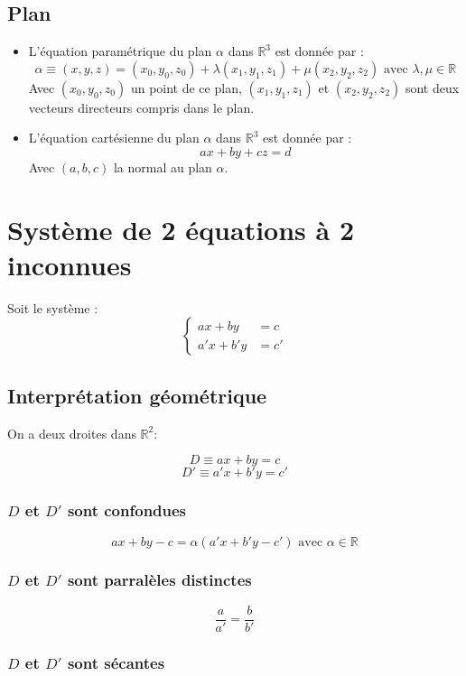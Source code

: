 \documentclass[a4paper,10pt]{report}
\begin{document}
\subsection{Plan}
\begin{itemize}
\item{L'équation paramétrique du plan $\alpha$ dans $\mathbb{R}^3$ est donnée par :
$$\alpha \equiv (x,y,z) = (x_0, y_0, z_0) + \lambda (x_1, y_1, z_1) + \mu (x_2, y_2, z_2) \mbox{ avec } \lambda,\mu \in \mathbb{R}$$
Avec $(x_0, y_0, z_0)$ un point de ce plan, $(x_1, y_1, z_1)$ et $(x_2, y_2, z_2)$ sont deux vecteurs directeurs compris dans le plan.}

\item{L'équation cartésienne du plan $\alpha$ dans $\mathbb{R}^3$ est donnée par :
$$ax + by + cz = d$$
Avec $(a,b,c)$ la normal au plan $\alpha$.
}
\end{itemize}

\section{Système de 2 équations à 2 inconnues}
Soit le système :
$$\left\{\begin{array}{ll}
 ax+by & = c\\
 a'x+b'y & = c'
 \end{array}\right.$$

\subsection{Interprétation géométrique}
On a deux droites dans $\mathbb{R}^2$:

$$D \equiv ax + by = c$$
$$D' \equiv a'x + b'y = c'$$

\subsubsection{$D$ et $D'$ sont confondues}

$$ax + by - c = \alpha (a'x + b'y - c') \mbox{ avec } \alpha \in \mathbb{R}$$

\subsubsection{$D$ et $D'$ sont parralèles distinctes}

$$\frac{a}{a'} = \frac{b}{b'}$$

\subsubsection{$D$ et $D'$ sont sécantes}
\end{document}
